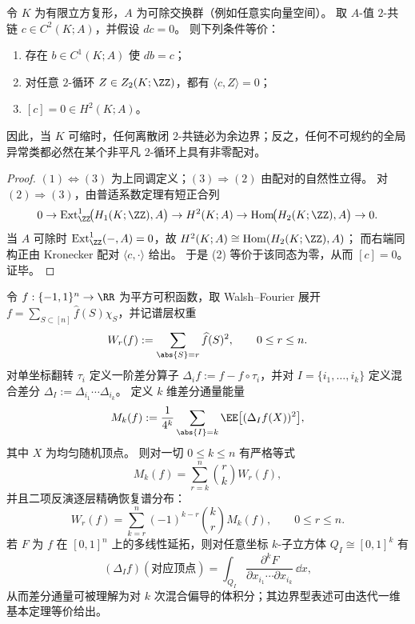 \begin{proposition}\label{prop:discussion-cubical-stokes-elimination-2cycle}
令 \(K\) 为有限立方复形，\(A\) 为可除交换群（例如任意实向量空间）。
取 \(A\)-值 \(2\)-共链 \(c\in C^{2}(K;A)\)，并假设 \(dc=0\)。
则下列条件等价：
\begin{enumerate}
  \item 存在 \(b\in C^{1}(K;A)\) 使 \(db=c\)；
  \item 对任意 \(2\)-循环 \(Z\in Z_{2}(K;\ZZ)\)，都有 \(\langle c,Z\rangle=0\)；
  \item \([c]=0\in H^{2}(K;A)\)。
\end{enumerate}
因此，当 \(K\) 可缩时，任何离散闭 \(2\)-共链必为余边界；反之，任何不可规约的全局异常类都必然在某个非平凡 \(2\)-循环上具有非零配对。
\end{proposition}
\begin{proof}
\((1)\Leftrightarrow(3)\) 为上同调定义；\((3)\Rightarrow(2)\) 由配对的自然性立得。
对 \((2)\Rightarrow(3)\)，由普适系数定理有短正合列
\[
0\to \mathrm{Ext}^{1}_{\ZZ}\!\bigl(H_{1}(K;\ZZ),A\bigr)\to H^{2}(K;A)\to \mathrm{Hom}\!\bigl(H_{2}(K;\ZZ),A\bigr)\to 0.
\]
当 \(A\) 可除时 \(\mathrm{Ext}^{1}_{\ZZ}(-,A)=0\)，故 \(H^{2}(K;A)\cong \mathrm{Hom}(H_{2}(K;\ZZ),A)\)；
而右端同构正由 Kronecker 配对 \(\langle c,\cdot\rangle\) 给出。
于是 (2) 等价于该同态为零，从而 \([c]=0\)。证毕。
\end{proof}



\begin{theorem}\label{thm:discussion-hypercube-stokes-fourier-binomial}
令 \(f:\{-1,1\}^n\to\RR\) 为平方可积函数，取 Walsh--Fourier 展开 \(f=\sum_{S\subset[n]}\widehat f(S)\chi_S\)，并记谱层权重
\[
  W_r(f):=\sum_{\abs{S}=r}\widehat f(S)^2,\qquad 0\le r\le n.
\]
对单坐标翻转 \(\tau_i\) 定义一阶差分算子 \(\Delta_i f:=f-f\circ\tau_i\)，并对 \(I=\{i_1,\dots,i_k\}\) 定义混合差分 \(\Delta_I:=\Delta_{i_1}\cdots\Delta_{i_k}\)。
定义 \(k\) 维差分通量能量
\[
  M_k(f):=\frac1{4^k}\sum_{\abs{I}=k}\EE\bigl[(\Delta_I f(X))^2\bigr],
\]
其中 \(X\) 为均匀随机顶点。
则对一切 \(0\le k\le n\) 有严格等式
\[
  M_k(f)=\sum_{r=k}^n\binom{r}{k}W_r(f),
\]
并且二项反演逐层精确恢复谱分布：
\[
  W_r(f)=\sum_{k=r}^n(-1)^{k-r}\binom{k}{r}M_k(f),\qquad 0\le r\le n.
\]
若 \(F\) 为 \(f\) 在 \([0,1]^n\) 上的多线性延拓，则对任意坐标 \(k\)-子立方体 \(Q_I\cong[0,1]^k\) 有
\[
  (\Delta_I f)(\text{对应顶点})
  =
  \int_{Q_I}\frac{\partial^k F}{\partial x_{i_1}\cdots\partial x_{i_k}}\,\dd x,
\]
从而差分通量可被理解为对 \(k\) 次混合偏导的体积分；其边界型表述可由迭代一维基本定理等价给出。
\end{theorem}

